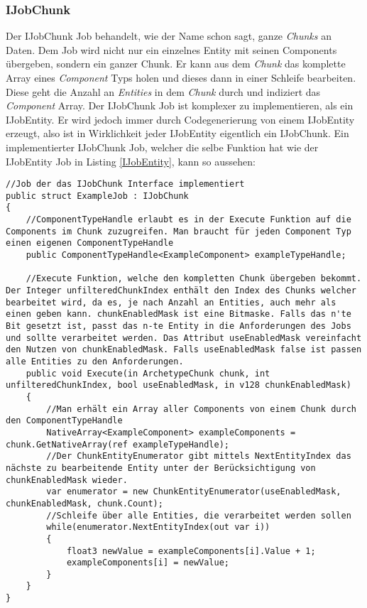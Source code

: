 \subsubsection{IJobChunk}
Der IJobChunk Job behandelt, wie der Name schon sagt, ganze \textit{Chunks} an Daten. Dem Job wird nicht nur ein einzelnes Entity mit seinen Components übergeben, sondern ein ganzer Chunk. Er kann aus dem \textit{Chunk} das komplette Array eines \textit{Component} Typs holen und dieses dann in einer Schleife bearbeiten. Diese geht die Anzahl an \textit{Entities} in dem \textit{Chunk} durch und indiziert das \textit{Component} Array. Der IJobChunk Job ist komplexer zu implementieren, als ein IJobEntity. Er wird jedoch immer durch Codegenerierung von einem IJobEntity erzeugt, also ist in Wirklichkeit jeder IJobEntity eigentlich ein IJobChunk. Ein implementierter IJobChunk Job, welcher die selbe Funktion hat wie der IJobEntity Job in Listing \ref{IJobEntity}, kann so aussehen:
\begin{lstlisting}[style=code, caption={IJobChunk Beispiel für eine einfache Addition. Diese ist analog zu dem IJobEntity Beispiel}, label=IJobChunk]
//Job der das IJobChunk Interface implementiert
public struct ExampleJob : IJobChunk
{
    //ComponentTypeHandle erlaubt es in der Execute Funktion auf die Components im Chunk zuzugreifen. Man braucht für jeden Component Typ einen eigenen ComponentTypeHandle
    public ComponentTypeHandle<ExampleComponent> exampleTypeHandle;

    //Execute Funktion, welche den kompletten Chunk übergeben bekommt. Der Integer unfilteredChunkIndex enthält den Index des Chunks welcher bearbeitet wird, da es, je nach Anzahl an Entities, auch mehr als einen geben kann. chunkEnabledMask ist eine Bitmaske. Falls das n'te Bit gesetzt ist, passt das n-te Entity in die Anforderungen des Jobs und sollte verarbeitet werden. Das Attribut useEnabledMask vereinfacht den Nutzen von chunkEnabledMask. Falls useEnabledMask false ist passen alle Entities zu den Anforderungen.
    public void Execute(in ArchetypeChunk chunk, int unfilteredChunkIndex, bool useEnabledMask, in v128 chunkEnabledMask)
    {
        //Man erhält ein Array aller Components von einem Chunk durch den ComponentTypeHandle
        NativeArray<ExampleComponent> exampleComponents = chunk.GetNativeArray(ref exampleTypeHandle);
        //Der ChunkEntityEnumerator gibt mittels NextEntityIndex das nächste zu bearbeitende Entity unter der Berücksichtigung von chunkEnabledMask wieder.
        var enumerator = new ChunkEntityEnumerator(useEnabledMask, chunkEnabledMask, chunk.Count);
        //Schleife über alle Entities, die verarbeitet werden sollen
        while(enumerator.NextEntityIndex(out var i))
        {
            float3 newValue = exampleComponents[i].Value + 1;
            exampleComponents[i] = newValue;
        }
    }
}
\end{lstlisting}
